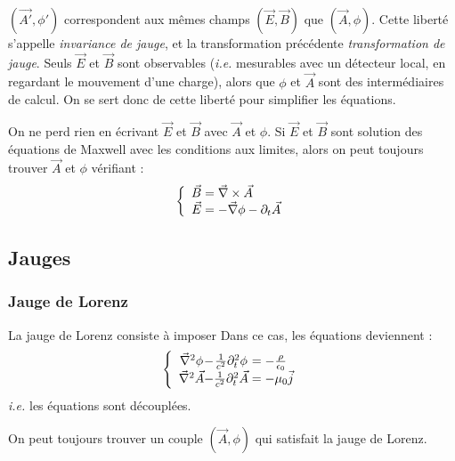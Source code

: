	$(\vec{A'},\phi')$ correspondent aux m\^emes champs $(\vec{E},\vec{B})$ que $(\vec{A},\phi)$. Cette liberté s'appelle \emph{invariance de jauge}, et la transformation précédente \emph{transformation de jauge}. Seuls $\vec{E}$ et $\vec{B}$ sont observables ({\it i.e.} mesurables avec un détecteur local, en regardant le mouvement d'une charge), alors que $\phi$ et $\vec{A}$ sont des intermédiaires de calcul. On se sert donc de cette liberté pour simplifier les équations.
\begin{remark}
	On ne perd rien en écrivant $\vec{E}$ et $\vec{B}$ avec $\vec{A}$ et $\phi$. Si $\vec{E}$ et $\vec{B}$ sont solution des équations de Maxwell avec les conditions aux limites, alors on peut toujours trouver $\vec{A}$ et $\phi$ vérifiant :
$$
		\left\{ \begin{array}{r@{\;}l}
			\vec{B}&=\nab\times\vec{A}\\
			\vec{E}&=-\nab\phi-\partial_t\vec{A}\\
		\end{array} \right.
$$
\end{remark}

\subsection{Jauges}
\subsubsection{Jauge de Lorenz}
	La jauge de Lorenz consiste à imposer 
	Dans ce cas, les équations deviennent :
$$
		\left\{ \begin{array}{c@{-}c@{\;}l}
			\nab^2\phi&\frac{1}{c^2}\partial_t^2\phi&=-\frac{\rho}{\epsilon_0}\\
			\nab^2\vec{A}&\frac{1}{c^2}\partial_t^2\vec{A}&=-\mu_0\vec{j}
		\end{array} \right.
$$
	\emph{i.e.} les équations sont découplées.

	\begin{theorem}
		On peut toujours trouver un couple $(\vec{A},\phi)$ qui satisfait la jauge de Lorenz.
	\end{theorem}
	
